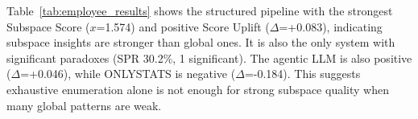 \documentclass[conference]{IEEEtran}
\begin{document}
{
\renewcommand{\arraystretch}{0.88}
\setlength{\abovecaptionskip}{0pt}
\setlength{\belowcaptionskip}{-4pt}
\begin{table}[!ht]
\caption{Results on IBM Employee Attrition (QUIS-Style=133, Agentic=81, ONLY=125)}
\centering
{}
\label{tab:employee_results}
\vspace{-3pt}
\end{table}
}

Table~\ref{tab:employee_results} shows the structured pipeline with the strongest Subspace Score ($x$=1.574) and positive Score Uplift ($\Delta$=+0.083), indicating subspace insights are stronger than global ones. It is also the only system with significant paradoxes (SPR 30.2\%, 1 significant). The agentic LLM is also positive ($\Delta$=+0.046), while ONLYSTATS is negative ($\Delta$=-0.184). This suggests exhaustive enumeration alone is not enough for strong subspace quality when many global patterns are weak.
\end{document}
